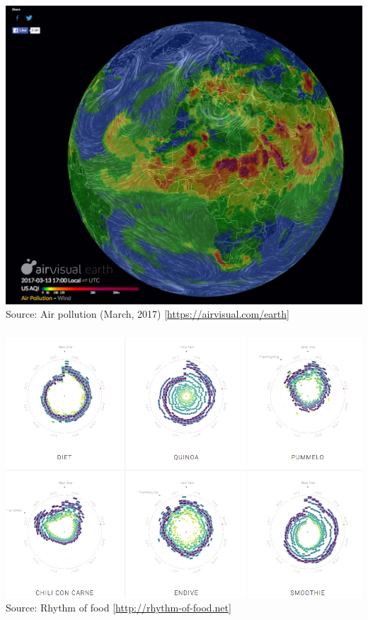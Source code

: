 \documentclass[8pt]{beamer}
\begin{document}

\begin{frame}
\frametitle{\insertsection}
\centering
\includegraphics[width=0.75\linewidth]{airpoll}\\
\tiny{Source: Air pollution (March, 2017) [\url{https://airvisual.com/earth}]}
\end{frame}


%

\begin{frame}
\frametitle{\insertsection}
\centering
\includegraphics[width=0.9\linewidth]{food}\\
\tiny{Source: Rhythm of food [\url{http://rhythm-of-food.net}]}
\end{frame}
\end{document}

